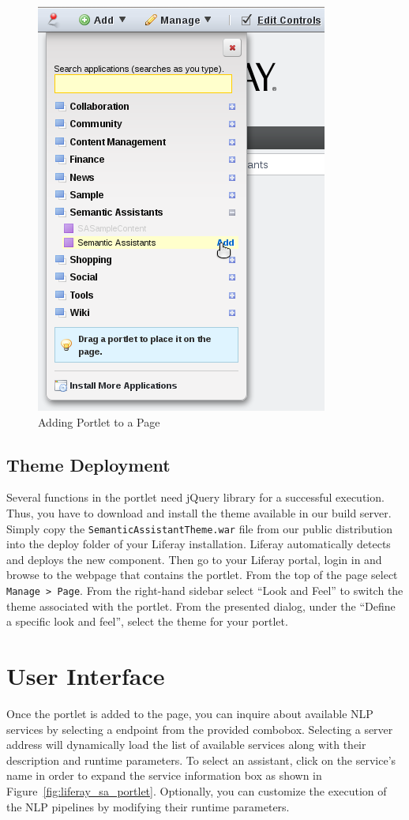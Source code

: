 \begin{figure}
\centering
\includegraphics[scale=0.6]{pictures/liferay_add_portlet.png}
\caption{Adding \sa Portlet to a Page}
\label{fig:liferay_add_portlet}
\end{figure}

\subsection{Theme Deployment}
\label{sec:theme_deploy}
Several functions in the \sa portlet need jQuery library for a successful execution. Thus, you have to download and install the \sa theme available in our build server. Simply copy the \texttt{SemanticAssistantTheme.war} file from our public distribution into the deploy folder of your Liferay installation. Liferay automatically detects and deploys the new component. Then go to your Liferay portal, login in and browse to the webpage that contains the \sa portlet. From the top of the page select \texttt{Manage \textgreater~Page}. From the right-hand sidebar select ``Look and Feel'' to switch the theme associated with the \sa portlet. From the presented dialog, under the ``Define a specific look and feel'', select the \sa theme for your portlet.

\section{User Interface}
Once the portlet is added to the page, you can inquire about available NLP services by selecting a \sa endpoint from the provided combobox. Selecting a server address will dynamically load the list of available services along with their description and runtime parameters. To select an assistant, click on the service's name in order to expand the service information box as shown in Figure~\ref{fig:liferay_sa_portlet}. Optionally, you can customize the execution of the NLP pipelines by modifying their runtime parameters.


